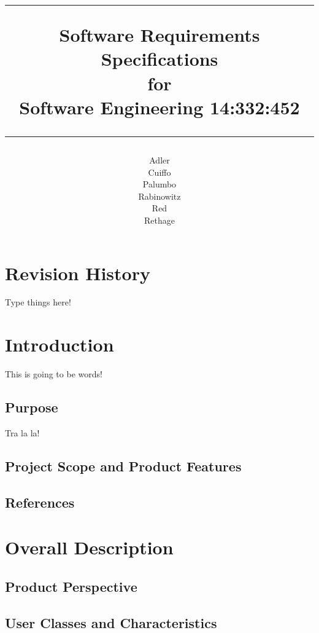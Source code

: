\documentclass[11pt,letterpaper]{scrreprt}
\title{%
{\color{color1} \rule{5.5in}{.5pt}\vskip1cm}
\Huge{\color{color1} Software Requirements\\ Specifications\\
\vspace{1cm}
for\\
\vspace{1cm}
Software Engineering 14:332:452
}
{\color{color1} \rule{5.5in}{.5pt}}
}
\author{
Adler\\
Cuiffo\\
Palumbo\\
Rabinowitz\\
Red\\
Rethage}
\date{}
\begin{document}
\maketitle
\tableofcontents
\chapter*{Revision History}
Type things here!
\chapter{Introduction}
This is going to be words!
\section{Purpose}
Tra la la!
\section{Project Scope and Product Features}
\section{References}
\chapter{Overall Description}
\section{Product Perspective}
\section{User Classes and Characteristics}
\end{document}
